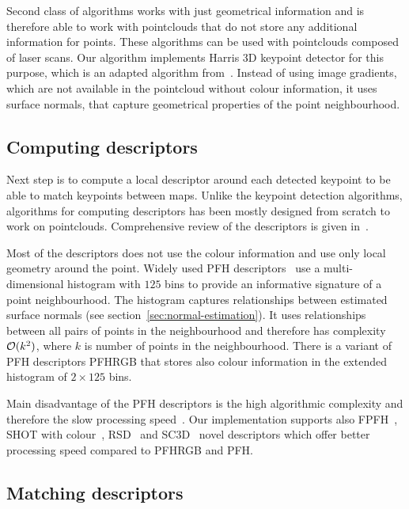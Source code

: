 Second class of algorithms works with just geometrical information and is therefore able to work with pointclouds that do not store any additional information for points. These algorithms can be used with pointclouds composed of laser scans. Our algorithm implements Harris \gls{3D} keypoint detector for this purpose, which is an adapted algorithm from~\citet{harris1988combined}. Instead of using image gradients, which are not available in the pointcloud without colour information, it uses surface normals, that capture geometrical properties of the point neighbourhood.

\subsection{Computing descriptors}

Next step is to compute a local descriptor around each detected keypoint to be able to match keypoints between maps. Unlike the keypoint detection algorithms, algorithms for computing descriptors has been mostly designed from scratch to work on pointclouds. Comprehensive review of the descriptors is given in~\citet{YasirThesis}.

Most of the descriptors does not use the colour information and use only local geometry around the point. Widely used \gls{PFH} descriptors~\citet{rusu2008pfh} use a multi-dimensional histogram with $125$ bins to provide an informative signature of a point neighbourhood. The histogram captures relationships between estimated surface normals (see section~\ref{sec:normal-estimation}). It uses relationships between all pairs of points in the neighbourhood and therefore has complexity $\operatorname{\mathcal{O}}(k^2)$, where $k$ is number of points in the neighbourhood. There is a variant of \gls{PFH} descriptors \gls{PFHRGB} that stores also colour information in the extended histogram of $2 \times 125$ bins.

Main disadvantage of the \gls{PFH} descriptors is the high algorithmic complexity and therefore the slow processing speed~\citet{rusu2009fpfh}. Our implementation supports also \gls{FPFH}~\citet{rusu2009fpfh}, \gls{SHOT} with colour~\citet{tombari2011shot}, \gls{RSD}~\citet{marton2010rsd} and \gls{SC3D}~\citet{frome2004sc3d} novel descriptors which offer better processing speed compared to \gls{PFHRGB} and \gls{PFH}.

\subsection{Matching descriptors}
\label{sec:matching}

